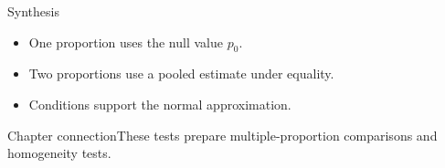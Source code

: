 \documentclass[10pt,aspectratio=169]{beamer}
\begin{document}
\begin{frame}{Synthesis}\small\begin{itemize}\item One proportion uses the null value $p_0$.\item Two proportions use a pooled estimate under equality.\item Conditions support the normal approximation.\end{itemize}\end{frame}
\begin{frame}{Chapter connection}\small These tests prepare multiple-proportion comparisons and homogeneity tests.\end{frame}
\end{document}
